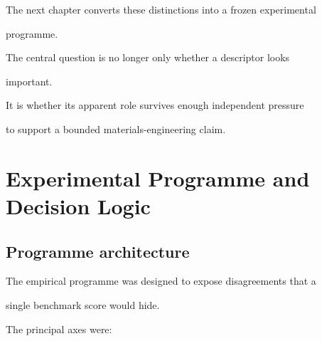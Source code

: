 \documentclass[11pt,a4paper,oneside]{report}
\begin{document}
The next chapter converts these distinctions into a frozen experimental

programme.



The central question is no longer only whether a descriptor looks

important.



It is whether its apparent role survives enough independent pressure

to support a bounded materials-engineering claim.












\chapter{Experimental Programme and Decision Logic}



\label{chap:experimental-design}





\section{Programme architecture}



The empirical programme was designed to expose disagreements that a

single benchmark score would hide.



The principal axes were:
\end{document}

